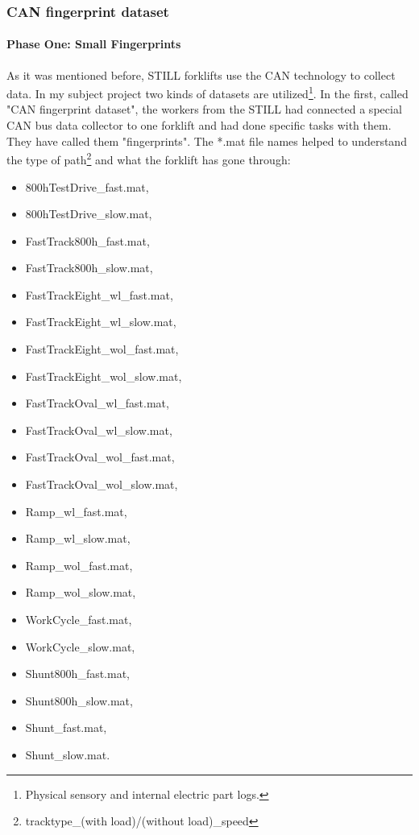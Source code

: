 			\subsubsection{CAN fingerprint dataset}
				\paragraph{Phase One: Small Fingerprints}
				\noindent
As it was mentioned before, STILL forklifts \cite{RX20} use the CAN technology \cite{CAN} to collect data. In my subject project two kinds of datasets are utilized\footnote{Physical sensory and internal electric part logs.}. In the first, called "CAN fingerprint dataset", the workers from the STILL had connected a special CAN bus data collector to one forklift and had done specific tasks with them. They have called them "fingerprints". The *.mat file names helped to understand the type of path\footnote{tracktype\_(with load)/(without load)\_speed} and what the forklift has gone through:

\begin{itemize}[noitemsep]
    \item {800hTestDrive\_fast.mat,}
    \item {800hTestDrive\_slow.mat,}
    \item {FastTrack800h\_fast.mat,}
 	\item {FastTrack800h\_slow.mat,}
	\item {FastTrackEight\_wl\_fast.mat,}
	\item {FastTrackEight\_wl\_slow.mat,}
	\item {FastTrackEight\_wol\_fast.mat,}
	\item {FastTrackEight\_wol\_slow.mat,}
  	\item {FastTrackOval\_wl\_fast.mat,}
	\item {FastTrackOval\_wl\_slow.mat,}
	\item {FastTrackOval\_wol\_fast.mat,}
	\item {FastTrackOval\_wol\_slow.mat,}
	\item {Ramp\_wl\_fast.mat,} 
	\item {Ramp\_wl\_slow.mat,}
	\item {Ramp\_wol\_fast.mat,}
	\item {Ramp\_wol\_slow.mat,}
    \item {WorkCycle\_fast.mat,}
    \item {WorkCycle\_slow.mat,}
	\item {Shunt800h\_fast.mat,}  	
  	\item {Shunt800h\_slow.mat,}
 	\item {Shunt\_fast.mat,} 	
 	\item {Shunt\_slow.mat.}
\end{itemize}


